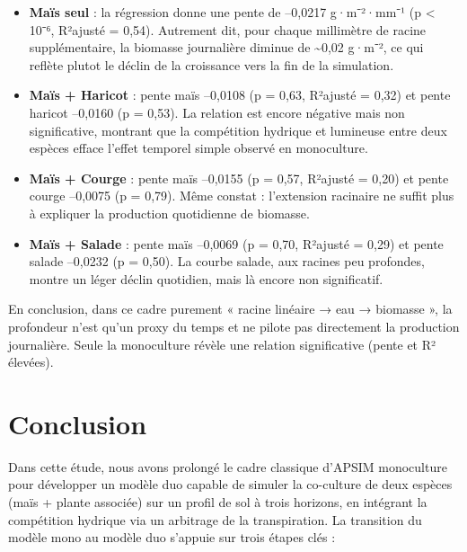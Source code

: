 \documentclass[
]{article}
\begin{document}
\begin{itemize}
\item
  \textbf{Maïs seul} : la régression donne une pente de --0,0217
  g·m⁻²·mm⁻¹ (p \textless{} 10⁻⁶, R²ajusté = 0,54). Autrement dit, pour
  chaque millimètre de racine supplémentaire, la biomasse journalière
  diminue de \textasciitilde0,02 g·m⁻², ce qui reflète plutot le déclin
  de la croissance vers la fin de la simulation.
\item
  \textbf{Maïs + Haricot} : pente maïs --0,0108 (p = 0,63, R²ajusté =
  0,32) et pente haricot --0,0160 (p = 0,53). La relation est encore
  négative mais non significative, montrant que la compétition hydrique
  et lumineuse entre deux espèces efface l'effet temporel simple observé
  en monoculture.
\item
  \textbf{Maïs + Courge} : pente maïs --0,0155 (p = 0,57, R²ajusté =
  0,20) et pente courge --0,0075 (p = 0,79). Même constat : l'extension
  racinaire ne suffit plus à expliquer la production quotidienne de
  biomasse.
\item
  \textbf{Maïs + Salade} : pente maïs --0,0069 (p = 0,70, R²ajusté =
  0,29) et pente salade --0,0232 (p = 0,50). La courbe salade, aux
  racines peu profondes, montre un léger déclin quotidien, mais là
  encore non significatif.
\end{itemize}

En conclusion, dans ce cadre purement « racine linéaire → eau → biomasse
», la profondeur n'est qu'un proxy du temps et ne pilote pas directement
la production journalière. Seule la monoculture révèle une relation
significative (pente et R² élevées).

\newpage

\section{Conclusion}\label{conclusion}

Dans cette étude, nous avons prolongé le cadre classique d'APSIM
monoculture pour développer un modèle duo capable de simuler la
co-culture de deux espèces (maïs + plante associée) sur un profil de sol
à trois horizons, en intégrant la compétition hydrique via un arbitrage
de la transpiration. La transition du modèle mono au modèle duo s'appuie
sur trois étapes clés :
\end{document}
